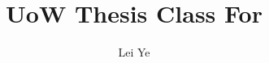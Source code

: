 %
\documentclass[master, copyright]{UoWthesis}
%
%
\usepackage{url}
%
%
%
\title{UoW Thesis Class For \LaTeXe}
\author{Lei Ye}
%
%
\unit{School of Computer Science and Software Engineering}
%
\dedicationtrue    %
\dedication{My Students \\and\\ Anyone Who May Love \LaTeX}
%
\noListOfTables    %
\noListOfFigures   %
%
%

